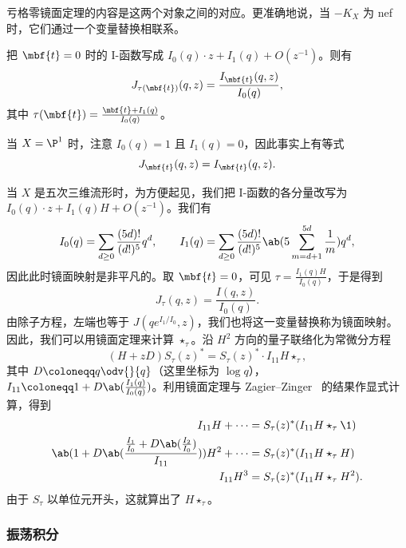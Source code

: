 亏格零镜面定理的内容是这两个对象之间的对应。更准确地说，当 \(-K_X\) 为 nef 时，它们通过一个变量替换相联系。

\begin{thm}
    把 \(\mbf{t} = 0\) 时的 I-函数写成 \(I_0(q) \cdot z + I_1(q) + O(z^{-1})\)。则有
    \[
        J_{\tau(\mbf{t})}(q,z) = \frac{I_{\mbf{t}}(q,z)}{I_0(q)},
    \]
    其中 \(\tau(\mbf{t}) = \frac{\mbf{t} + I_1(q)}{I_0(q)}\)。
\end{thm}

\begin{exm}
    当 \(X = \P^1\) 时，注意 \(I_0(q) = 1\) 且 \(I_1(q) = 0\)，因此事实上有等式
    \[ J_{\mbf{t}}(q,z) = I_{\mbf{t}}(q,z). \]
\end{exm}

\begin{exm}
    当 \(X\) 是五次三维流形时，为方便起见，我们把 I-函数的各分量改写为 \(I_0(q) \cdot z + I_1(q)H + O(z^{-1})\)。我们有
    \[ I_0(q) = \sum_{d \geq 0} \frac{(5d)!}{(d!)^5} q^d, \qquad I_1(q) = \sum_{d \geq 0} \frac{(5d)!}{(d!)^5} \ab(5\sum_{m=d+1}^{5d} \frac{1}{m}) q^d, \]
    因此此时镜面映射是非平凡的。取 \(\mbf{t} = 0\)，可见 \(\tau = \frac{I_1(q)H}{I_0(q)}\)，于是得到
    \[ J_{\tau}(q,z) = \frac{I(q,z)}{I_0(q)}. \]
    由除子方程，左端也等于 \(J(qe^{I_1/I_0}, z)\)，我们也将这一变量替换称为镜面映射。
    因此，我们可以用镜面定理来计算 $\star_{\tau}$。沿 \(H^2\) 方向的量子联络化为常微分方程
    \[ (H+zD) S_{\tau}(z)^* = S_{\tau}(z)^* \cdot I_{11} H \star_{\tau}, \]
    其中 $D \coloneqq q \odv{}{q}$（这里坐标为 $\log q$），$I_{11} \coloneqq 1 + D \ab(\frac{I_1(q)}{I_0(q)})$。利用镜面定理与 Zagier--Zinger~\cite{ZagierZinger2008} 的结果作显式计算，得到
    \begin{align*}
        I_{11} H + \cdots &= S_{\tau}(z)^* (I_{11} H \star_{\tau} \1) \\
        \ab( 1 + D\ab(\frac{\frac{I_1}{I_0} + D \ab(\frac{I_2}{I_0})}{I_{11}}) ) H^2 + \cdots &= S_{\tau}(z)^* (I_{11} H \star_{\tau} H) \\
        I_{11} H^3 &= S_{\tau}(z)^* (I_{11}H \star_{\tau} H^2).
    \end{align*}
    由于 $S_{\tau}$ 以单位元开头，这就算出了 $H \star_{\tau}$。
\end{exm}

\subsubsection{振荡积分}%
\label{ssub:Oscillating integrals}

